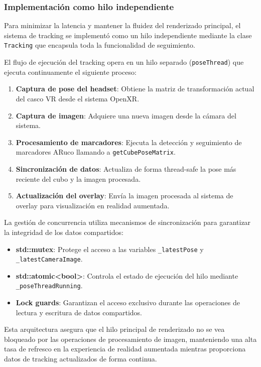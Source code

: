 \subsubsection{Implementación como hilo independiente}
Para minimizar la latencia y mantener la fluidez del renderizado principal, el sistema de tracking se implementó como un hilo independiente mediante la clase \texttt{Tracking} que encapsula toda la funcionalidad de seguimiento.

El flujo de ejecución del tracking opera en un hilo separado (\texttt{poseThread}) que ejecuta continuamente el siguiente proceso:

\begin{enumerate}
    \item \textbf{Captura de pose del headset}: Obtiene la matriz de transformación actual del casco VR desde el sistema OpenXR.
    \item \textbf{Captura de imagen}: Adquiere una nueva imagen desde la cámara del sistema.
    \item \textbf{Procesamiento de marcadores}: Ejecuta la detección y seguimiento de marcadores ARuco llamando a \texttt{getCubePoseMatrix}.
    \item \textbf{Sincronización de datos}: Actualiza de forma thread-safe la pose más reciente del cubo y la imagen procesada.
    \item \textbf{Actualización del overlay}: Envía la imagen procesada al sistema de overlay para visualización en realidad aumentada.
\end{enumerate}

La gestión de concurrencia utiliza mecanismos de sincronización para garantizar la integridad de los datos compartidos:
\begin{itemize}
    \item \textbf{std::mutex}: Protege el acceso a las variables \texttt{\_latestPose} y \texttt{\_latestCameraImage}.
    \item \textbf{std::atomic<bool>}: Controla el estado de ejecución del hilo mediante \texttt{\_poseThreadRunning}.
    \item \textbf{Lock guards}: Garantizan el acceso exclusivo durante las operaciones de lectura y escritura de datos compartidos.
\end{itemize}

Esta arquitectura asegura que el hilo principal de renderizado no se vea bloqueado por las operaciones de procesamiento de imagen, manteniendo una alta tasa de refresco en la experiencia de realidad aumentada mientras proporciona datos de tracking actualizados de forma continua.

